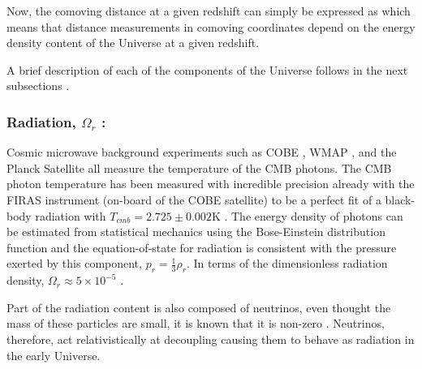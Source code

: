 \qquad Now, the comoving distance at a given redshift can simply be expressed as
which means that distance measurements in comoving coordinates depend on the energy density content of the Universe at a given redshift. 

\qquad A brief description of each of the components of the Universe follows in the next subsections \citep{dods,schneider_2016}.

\subsubsection{Radiation, $\Omega_r$ :}
 Cosmic microwave background experiments such as COBE \citep{COBE}, WMAP \citep{WMAP_MapsResults,WMAP_Cosmology}, and the Planck Satellite \citep{2018PlanckCosmology} all measure the temperature of the CMB photons. The CMB photon temperature has been measured with incredible precision already with the FIRAS instrument (on-board of the COBE satellite) to be a perfect fit of a black-body radiation with $T_{cmb} = 2.725\pm 0.002$K \citep{1999FIRAS}. The energy density of photons can be estimated from statistical mechanics using the Bose-Einstein distribution function \citep{dods}
and the equation-of-state for radiation is consistent with the pressure exerted by this component, $p_r = \frac{1}{3}\rho_r$. In terms of the dimensionless radiation density, $\Omega_r \approx 5 \times 10^{-5}$ \citep{schneider_2016}.

\qquad Part of the radiation content is also composed of neutrinos, even thought the mass of these particles are small, it is known that it is non-zero \citep{Kamiokande1998}. Neutrinos, therefore, act relativistically at decoupling causing them to behave as radiation in the early Universe.

